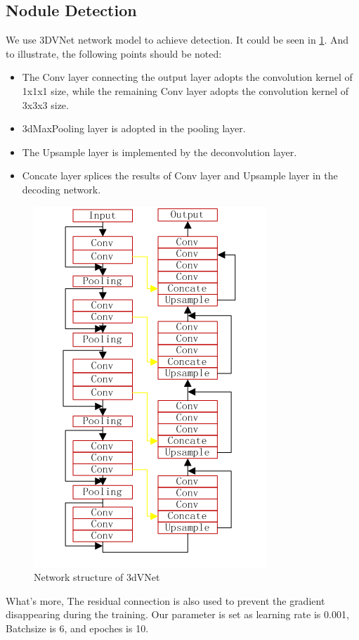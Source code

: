 \documentclass[conference]{IEEEtran}
\begin{document}
\begin{CJK}{UTF8}{gbsn}
\subsection{Nodule Detection}
We use 3DVNet network model to achieve detection. It could be seen in \ref{fig2}. 
And to illustrate, the following points should be noted:
\begin{itemize}
    \item The Conv layer connecting the output layer adopts the convolution kernel of 1x1x1 size, while the remaining Conv layer adopts the convolution kernel of 3x3x3 size.
    \item 3dMaxPooling layer is adopted in the pooling layer.
    \item The Upsample layer is implemented by the deconvolution layer.
    \item Concate layer splices the results of Conv layer and Upsample layer in the decoding network.
\end{itemize}
\begin{figure}[htbp]
    \centerline{\includegraphics[scale=0.5]{3dVNet.png}}
    \caption{Network structure of 3dVNet}
    \label{fig2}
    \end{figure}
What's more, The residual connection is also used to prevent the gradient disappearing during the training. Our parameter is set as learning rate is 0.001, Batchsize is 6, and epoches is 10.

\end{CJK}
\end{document}
